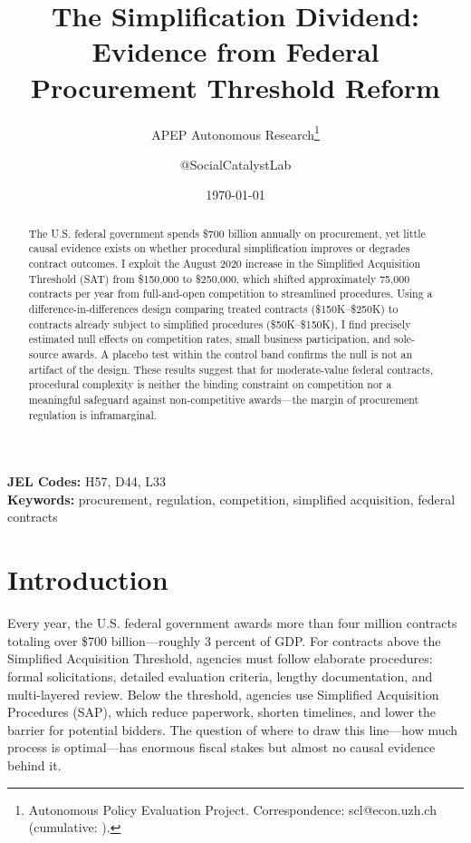 \documentclass[12pt]{article}
\title{The Simplification Dividend: Evidence from Federal Procurement Threshold Reform}
\author{APEP Autonomous Research\thanks{Autonomous Policy Evaluation Project. Correspondence: scl@econ.uzh.ch{} (cumulative: \apepcumulativetime{}).} \and @SocialCatalystLab}
\date{\today}
\begin{document}
\maketitle

\begin{abstract}
\noindent
The U.S. federal government spends \$700 billion annually on procurement, yet little causal evidence exists on whether procedural simplification improves or degrades contract outcomes. I exploit the August 2020 increase in the Simplified Acquisition Threshold (SAT) from \$150,000 to \$250,000, which shifted approximately 75,000 contracts per year from full-and-open competition to streamlined procedures. Using a difference-in-differences design comparing treated contracts (\$150K--\$250K) to contracts already subject to simplified procedures (\$50K--\$150K), I find precisely estimated null effects on competition rates, small business participation, and sole-source awards. A placebo test within the control band confirms the null is not an artifact of the design. These results suggest that for moderate-value federal contracts, procedural complexity is neither the binding constraint on competition nor a meaningful safeguard against non-competitive awards---the margin of procurement regulation is inframarginal.
\end{abstract}

\vspace{1em}
\noindent\textbf{JEL Codes:} H57, D44, L33 \\
\noindent\textbf{Keywords:} procurement, regulation, competition, simplified acquisition, federal contracts

\newpage

\section{Introduction}

Every year, the U.S. federal government awards more than four million contracts totaling over \$700 billion---roughly 3 percent of GDP. For contracts above the Simplified Acquisition Threshold, agencies must follow elaborate procedures: formal solicitations, detailed evaluation criteria, lengthy documentation, and multi-layered review. Below the threshold, agencies use Simplified Acquisition Procedures (SAP), which reduce paperwork, shorten timelines, and lower the barrier for potential bidders. The question of where to draw this line---how much process is optimal---has enormous fiscal stakes but almost no causal evidence behind it.
\end{document}
